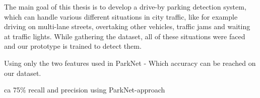 The main goal of this thesis is to develop a drive-by parking detection system, which can handle various different situations in city traffic, like for example driving on multi-lane streets, overtaking other vehicles, traffic jams and waiting at traffic lights. While gathering the dataset, all of these situations were faced and our prototype is trained to detect them. 




Using only the two features used in ParkNet - Which accuracy can be reached on our dataset.

ca 75\% recall and precision using ParkNet-approach